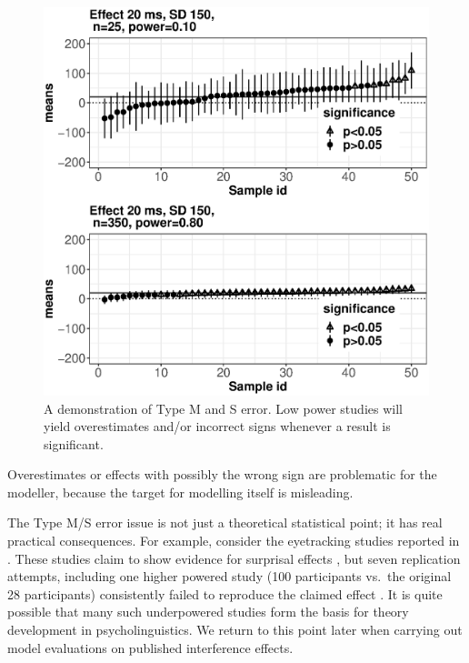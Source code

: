\documentclass{cambridge7A}\usepackage[]{graphicx}\usepackage[]{color}
\makeatletter
\def\maxwidth{ %
  \ifdim\Gin@nat@width>\linewidth
    \linewidth
  \else
    \Gin@nat@width
  \fi
}
\newenvironment{knitrout}{}{} %
\makeatother
\begin{document}
\begin{figure}[!htbp]
\centering
\begin{knitrout}
\color{fgcolor}

{\centering \includegraphics[width=\maxwidth]{figures/fig-typemdemo-1} 

}



\end{knitrout}
\caption{A demonstration of  Type M and S error. Low power studies will yield overestimates and/or incorrect signs whenever a result is significant.}\label{fig:typemdemo}
\end{figure}

Overestimates or effects with possibly the wrong sign are problematic for
the modeller, because the target for modelling itself is
misleading. 

 
The Type M/S error issue is not just a theoretical statistical point; it has real
practical consequences. For example, consider the eyetracking studies
reported in \cite{LevyKeller2013}. These studies claim to show 
evidence for surprisal effects \citep{Hale2001,Levy2008}, but seven
replication attempts, including one higher powered study (100 participants vs.\ the original 28 participants) consistently failed to reproduce the claimed
effect \citep{VasishthMertzenJaegerGelman2018}. It is quite possible that 
many such underpowered studies form the basis for theory development in
psycholinguistics. We return to this point later when carrying out
model evaluations on published interference effects.
\end{document}

